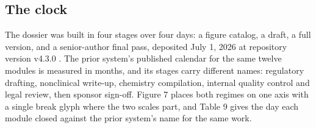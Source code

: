 \subsection{The clock}

The dossier was built in four stages over four days: a figure catalog, a draft,
a full version, and a senior-author final pass, deposited July 1, 2026 at
repository version v4.3.0 \cite{phase1ind}. The prior system's published
calendar for the same twelve modules is measured in months, and its stages carry
different names: regulatory drafting, nonclinical write-up, chemistry
compilation, internal quality control and legal review, then sponsor sign-off.
Figure 7 places both regimes on one axis with a single break glyph where the two
scales part, and Table 9 gives the day each module closed against the prior
system's name for the same work.

